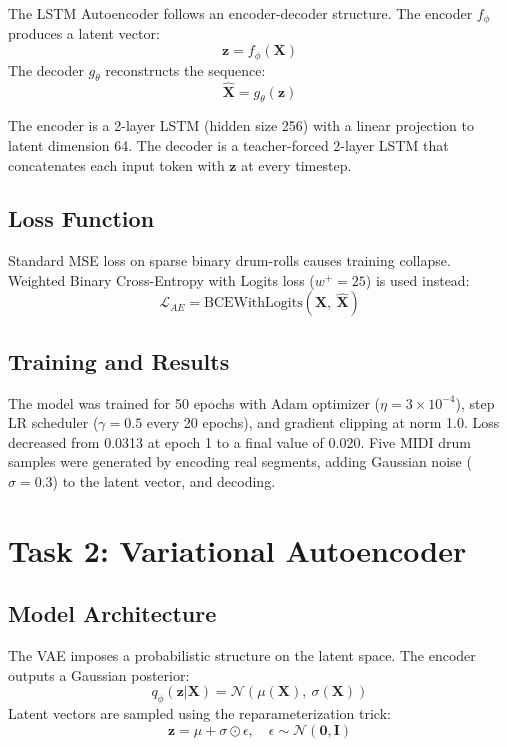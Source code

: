 \documentclass[conference]{IEEEtran}
\begin{document}
The LSTM Autoencoder follows an encoder-decoder structure. The encoder $f_\phi$ produces a latent vector:
\begin{equation}
\mathbf{z} = f_\phi(\mathbf{X})
\end{equation}
The decoder $g_\theta$ reconstructs the sequence:
\begin{equation}
\hat{\mathbf{X}} = g_\theta(\mathbf{z})
\end{equation}

The encoder is a 2-layer LSTM (hidden size 256) with a linear projection to latent dimension 64. The decoder is a teacher-forced 2-layer LSTM that concatenates each input token with $\mathbf{z}$ at every timestep.

\subsection{Loss Function}

Standard MSE loss on sparse binary drum-rolls causes training collapse. Weighted Binary Cross-Entropy with Logits loss ($w^+ = 25$) is used instead:
\begin{equation}
\mathcal{L}_{AE} = \text{BCEWithLogits}(\mathbf{X},\ \hat{\mathbf{X}})
\end{equation}

\subsection{Training and Results}

The model was trained for 50 epochs with Adam optimizer ($\eta = 3 \times 10^{-4}$), step LR scheduler ($\gamma = 0.5$ every 20 epochs), and gradient clipping at norm 1.0. Loss decreased from 0.0313 at epoch 1 to a final value of 0.020. Five MIDI drum samples were generated by encoding real segments, adding Gaussian noise ($\sigma = 0.3$) to the latent vector, and decoding.

\section{Task 2: Variational Autoencoder}

\subsection{Model Architecture}

The VAE imposes a probabilistic structure on the latent space. The encoder outputs a Gaussian posterior:
\begin{equation}
q_\phi(\mathbf{z}|\mathbf{X}) = \mathcal{N}(\mu(\mathbf{X}),\ \sigma(\mathbf{X}))
\end{equation}
Latent vectors are sampled using the reparameterization trick:
\begin{equation}
\mathbf{z} = \mu + \sigma \odot \epsilon, \quad \epsilon \sim \mathcal{N}(\mathbf{0}, \mathbf{I})
\end{equation}
\end{document}
